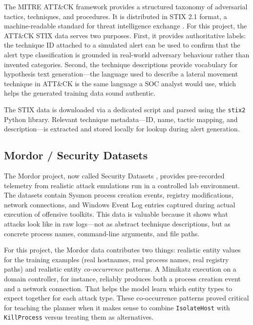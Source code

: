 The MITRE ATT\&CK framework \cite{strom2018attack} provides a structured taxonomy of adversarial tactics, techniques, and procedures. It is distributed in STIX 2.1 format, a machine-readable standard for threat intelligence exchange \cite{stix21}. For this project, the ATT\&CK STIX data serves two purposes. First, it provides authoritative labels: the technique ID attached to a simulated alert can be used to confirm that the alert type classification is grounded in real-world adversary behaviour rather than invented categories. Second, the technique descriptions provide vocabulary for hypothesis text generation---the language used to describe a lateral movement technique in ATT\&CK is the same language a SOC analyst would use, which helps the generated training data sound authentic.

The STIX data is downloaded via a dedicated script and parsed using the \texttt{stix2} Python library. Relevant technique metadata---ID, name, tactic mapping, and description---is extracted and stored locally for lookup during alert generation.

\subsection{Mordor / Security Datasets}

The Mordor project, now called Security Datasets \cite{rodriguez2020mordor}, provides pre-recorded telemetry from realistic attack emulations run in a controlled lab environment. The datasets contain Sysmon process creation events, registry modifications, network connections, and Windows Event Log entries captured during actual execution of offensive toolkits. This data is valuable because it shows what attacks look like in raw logs---not as abstract technique descriptions, but as concrete process names, command-line arguments, and file paths.

For this project, the Mordor data contributes two things: realistic entity values for the training examples (real hostnames, real process names, real registry paths) and realistic entity \emph{co-occurrence} patterns. A Mimikatz execution on a domain controller, for instance, reliably produces both a process creation event and a network connection. That helps the model learn which entity types to expect together for each attack type. These co-occurrence patterns proved critical for teaching the planner when it makes sense to combine \texttt{IsolateHost} with \texttt{KillProcess} versus treating them as alternatives.

